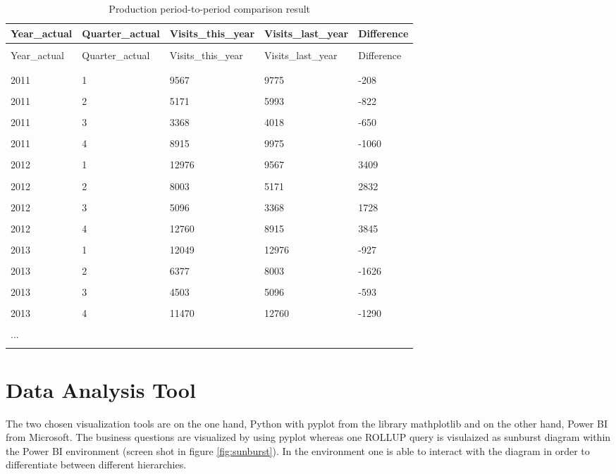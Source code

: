 \documentclass[letterpaper,12pt]{article}
\begin{document}
\begingroup
\renewcommand\arraystretch{0.5}
\begin{longtable}{p{2.5cm}p{3cm}p{3cm}p{3cm}p{2cm}}
        \caption{Production period-to-period comparison result} \\
	Year\_actual & Quarter\_actual & Visits\_this\_year & Visits\_last\_year & Difference \\
        \endfirsthead \\
        Year\_actual & Quarter\_actual & Visits\_this\_year & Visits\_last\_year & Difference \\
        \endhead \\
        \hline \\
        2011 & 1 & 9567 & 9775 & -208 \\
\hline \\
2011 & 2 & 5171 & 5993 & -822 \\
\hline \\
2011 & 3 & 3368 & 4018 & -650 \\
\hline \\
2011 & 4 & 8915 & 9975 & -1060 \\
\hline \\
2012 & 1 & 12976 & 9567 & 3409 \\
\hline \\
2012 & 2 & 8003 & 5171 & 2832 \\
\hline \\
2012 & 3 & 5096 & 3368 & 1728 \\
\hline \\
2012 & 4 & 12760 & 8915 & 3845 \\
\hline \\
2013 & 1 & 12049 & 12976 & -927 \\
\hline \\
2013 & 2 & 6377 & 8003 & -1626 \\
\hline \\
2013 & 3 & 4503 & 5096 & -593 \\
\hline \\
2013 & 4 & 11470 & 12760 & -1290 \\
\hline \\

        ... & & & \\
        \hline \\
\end{longtable}
\endgroup

\section{Data Analysis Tool}
The two chosen visualization tools are on the one hand, Python with pyplot from the library mathplotlib and on the other hand, Power BI from Microsoft.
The business questions are visualized by using pyplot whereas one ROLLUP query is visulaized as sunburst diagram within the Power BI environment (screen shot in figure \ref{fig:sunburst}). In the environment one is able to interact with the diagram in order to differentiate between different hierarchies.
\end{document}
